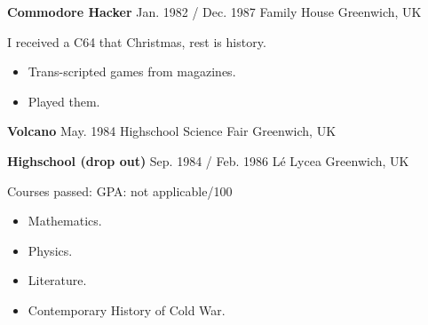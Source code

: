         \cvItemDocDuo
        {\large \textbf{Commodore Hacker}}
    	{Jan. 1982 / Dec. 1987}
    	{Family House}
    	{Greenwich, UK}
        {
            I received a C64 that Christmas, rest is history.
            \par
                \begin{itemize}
        	        \setlength\itemsep{0em}
        	        \item Trans-scripted games from magazines.
        	        \item Played them.
                \end{itemize}
        }
    
        \cvItemDocDuoHead
        {\large \textbf{Volcano}}
        {May. 1984}
        {Highschool Science Fair}
        {Greenwich, UK}
        
        
    
        \cvItemDocDuo
        {\large \textbf{Highschool (drop out)}}
        {Sep. 1984 / Feb. 1986}
        {L\'{e} Lycea}
        {Greenwich, UK}
        {
            Courses passed: \hfill {\small GPA: not applicable/100}
            \par
            \parbox[t]{\textwidth*\real{0.50}*\real{\rdesc}}{
                \begin{itemize}
        	        \setlength\itemsep{0em}
        	        \small
                    \item Mathematics.
                    \item Physics.
                \end{itemize}
            }   
            \parbox[t]{\textwidth*\real{0.50}*\real{\rdesc}}{
                \begin{itemize}
        	        \setlength\itemsep{0em}
        	        \small
        	        \item Literature.
                    \item Contemporary History of Cold War.
                \end{itemize}
            }
        }
    
    \null\vfill

